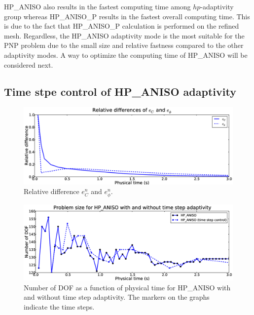 HP\_ANISO also results in the fastest
computing time among $hp$-adaptivity group whereas HP\_ANISO\_P
results in the fastest overall computing time. This is due to the fact
that HP\_ANISO\_P calculation is performed on the refined mesh. 
Regardless, the HP\_ANISO adaptivity mode is the most suitable
for the PNP problem due to the small size and relative fastness compared
to the other adaptivity modes. A way to optimize the computing time
of HP\_ANISO will be considered next.

\subsection{Time stpe control of HP\_ANISO adaptivity}

\begin{figure}[!ht]
  \begin{centering}
  \includegraphics[width=\columnwidth]{cphi_relerr}
  \caption{\label{fig:cphirelerr} Relative difference $e_{C}^n$ and $e_{\phi}^n$.}
  \end{centering}
\end{figure}
\begin{figure}[!ht]
  \begin{centering}
  \includegraphics[width=\columnwidth]{timeadapt_dof}
  \caption{\label{fig:timeadapt_dof} Number of DOF
  as a function of physical time for HP\_ANISO with and without
  time step adaptivity. The markers on the graphs indicate the
  time steps.}
  \end{centering}
\end{figure}
